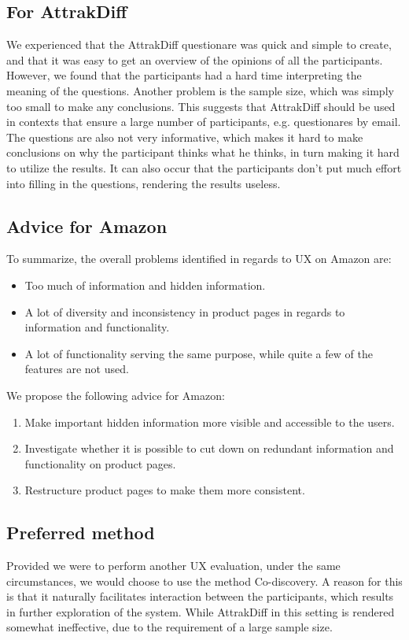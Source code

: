 \subsection{For AttrakDiff}
We experienced that the AttrakDiff questionare was quick and simple to create, and that it was easy to get an overview of the opinions of all the participants. However, we found that the participants had a hard time interpreting the meaning of the questions. Another problem is the sample size, which was simply too small to make any conclusions. This suggests that AttrakDiff should be used in contexts that ensure a large number of participants, e.g. questionares by email. The questions are also not very informative, which makes it hard to make conclusions on why the participant thinks what he thinks, in turn making it hard to utilize the results. It can also occur that the participants don't put much effort into filling in the questions, rendering the results useless.

\subsection{Advice for Amazon}
To summarize, the overall problems identified in regards to UX on Amazon are:
\begin{itemize}
	\item Too much of information and hidden information.
	\item A lot of diversity and inconsistency in product pages in regards to information and functionality.
	\item A lot of functionality serving the same purpose, while quite a few of the features are not used. 
\end{itemize}

We propose the following advice for Amazon:

\begin{enumerate}
\item Make important hidden information more visible and accessible to the users.
\item Investigate whether it is possible to cut down on redundant information and functionality on product pages.
\item Restructure product pages to make them more consistent.
\end{enumerate}

\subsection{Preferred method}
Provided we were to perform another UX evaluation, under the same circumstances, we would choose to use the method Co-discovery. A reason for this is that it naturally facilitates interaction between the participants, which results in further exploration of the system. While AttrakDiff in this setting is rendered somewhat ineffective, due to the requirement of a large sample size.